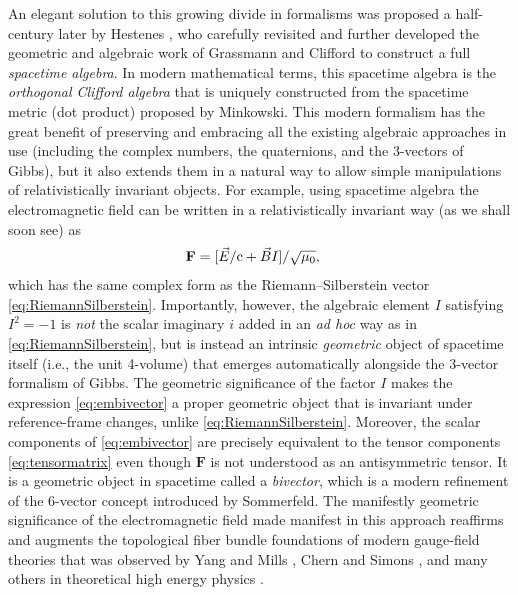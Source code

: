 \documentclass[1p,sort&compress]{elsarticle}
\numberwithin{equation}{section}
\newcommand{\rv}[1]{\vec{#1}}
\newcommand{\bv}[1]{\mathbf{#1}}
\newcommand{\cc}{{\rm c}}
\begin{document}
An elegant solution to this growing divide in formalisms was proposed a half-century later by Hestenes \cite{Hestenes1966}, who carefully revisited and further developed the geometric and algebraic work of Grassmann \cite{Grassmann1844} and Clifford \cite{Clifford1878} to construct a full \emph{spacetime algebra}.  In modern mathematical terms, this spacetime algebra is the \emph{orthogonal Clifford algebra} \cite{Crumeyrolle1990} that is uniquely constructed from the spacetime metric (dot product) proposed by Minkowski.  This modern formalism has the great benefit of preserving and embracing all the existing algebraic approaches in use (including the complex numbers, the quaternions, and the 3-vectors of Gibbs), but it also extends them in a natural way to allow simple manipulations of relativistically invariant objects.  For example, using spacetime algebra the electromagnetic field can be written in a relativistically invariant way (as we shall soon see) as
\begin{align}\label{eq:embivector}
  \bv{F} &= [\rv{E}/\cc + \rv{B} I]/\sqrt{\mu_0},
\end{align}
which has the same complex form as the Riemann--Silberstein vector \eqref{eq:RiemannSilberstein}.  Importantly, however, the algebraic element $I$ satisfying $I^2 = -1$ is \emph{not} the scalar imaginary $i$ added in an \emph{ad hoc} way as in \eqref{eq:RiemannSilberstein}, but is instead an intrinsic \emph{geometric} object of spacetime itself (i.e., the unit 4-volume) that emerges automatically alongside the 3-vector formalism of Gibbs.  The geometric significance of the factor $I$ makes the expression \eqref{eq:embivector} a proper geometric object that is invariant under reference-frame changes, unlike \eqref{eq:RiemannSilberstein}.  Moreover, the scalar components of \eqref{eq:embivector} are precisely equivalent to the tensor components \eqref{eq:tensormatrix} even though $\bv{F}$ is not understood as an antisymmetric tensor.  It is a geometric object in spacetime called a \emph{bivector}, which is a modern refinement of the 6-vector concept introduced by Sommerfeld.  The manifestly geometric significance of the electromagnetic field made manifest in this approach reaffirms and augments the topological fiber bundle foundations of modern gauge-field theories that was observed by Yang and Mills \cite{Yang1954,Yang1980,Yang2014,Yang2014b}, Chern and Simons \cite{Chern1974}, and many others in theoretical high energy physics \cite{Aharonov1959,THooft1972,Tonomura1986,Witten1988,Weinberg1995,Nakahara2003,Wu2006}.
\end{document}
